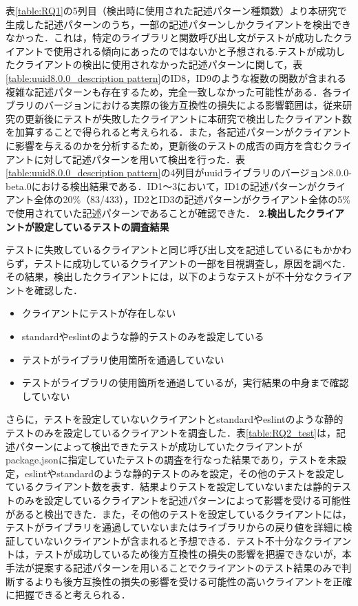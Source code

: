 \documentclass[11pt]{jreport}
\begin{document}
表\ref{table:RQ1}の5列目（検出時に使用された記述パターン種類数）より本研究で生成した記述パターンのうち，一部の記述パターンしかクライアントを検出できなかった．これは，特定のライブラリと関数呼び出し文がテストが成功したクライアントで使用される傾向にあったのではないかと予想される.テストが成功したクライアントの検出に使用されなかった記述パターンに関して，表\ref{table:uuid8.0.0_description pattern}のID8，ID9のような複数の関数が含まれる複雑な記述パターンも存在するため，完全一致しなかった可能性がある．各ライブラリのバージョンにおける実際の後方互換性の損失による影響範囲は，従来研究の更新後にテストが失敗したクライアントに本研究で検出したクライアント数を加算することで得られると考えられる．また，各記述パターンがクライアントに影響を与えるのかを分析するため，更新後のテストの成否の両方を含むクライアントに対して記述パターンを用いて検出を行った．表\ref{table:uuid8.0.0_description pattern}の4列目がuuidライブラリのバージョン8.0.0-beta.0における検出結果である．ID1〜3において，ID1の記述パターンがクライアント全体の20\%（83/433），ID2とID3の記述パターンがクライアント全体の5\%で使用されていた記述パターンであることが確認できた．
\textbf{\newline\newline}
\noindent\textbf{2.検出したクライアントが設定しているテストの調査結果}

テストに失敗しているクライアントと同じ呼び出し文を記述しているにもかかわらず，テストに成功しているクライアントの一部を目視調査し，原因を調べた．その結果，検出したクライアントには，以下のようなテストが不十分なクライアントを確認した．

\begin{itemize}
\item クライアントにテストが存在しない
\item standardやeslintのような静的テストのみを設定している
\item テストがライブラリ使用箇所を通過していない
\item テストがライブラリの使用箇所を通過しているが，実行結果の中身まで確認していない
\end{itemize}

さらに，テストを設定していないクライアントとstandardやeslintのような静的テストのみを設定しているクライアントを調査した．表\ref{table:RQ2_test}は，記述パターンによって検出できたテストが成功していたクライアントがpackage.jsonに指定していたテストの調査を行なった結果であり，テストを未設定，eslintやstandardのような静的テストのみを設定，その他のテストを設定しているクライアント数を表す．結果よりテストを設定していないまたは静的テストのみを設定しているクライアントを記述パターンによって影響を受ける可能性があると検出できた．また，その他のテストを設定しているクライアントには，テストがライブラリを通過していないまたはライブラリからの戻り値を詳細に検証していないクライアントが含まれると予想できる．テスト不十分なクライアントは，テストが成功しているため後方互換性の損失の影響を把握できないが，本手法が提案する記述パターンを用いることでクライアントのテスト結果のみで判断するよりも後方互換性の損失の影響を受ける可能性の高いクライアントを正確に把握できると考えられる．
\end{document}

